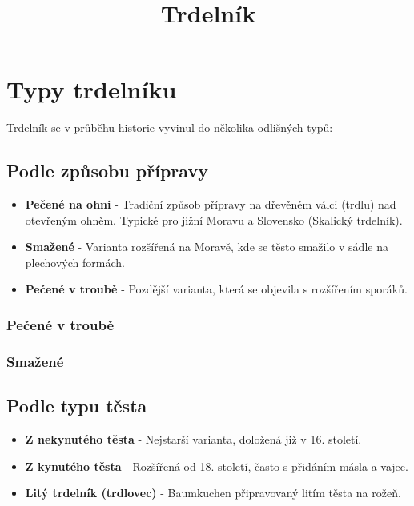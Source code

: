 \documentclass[a5paper,10pt]{book}
\title{Trdelník}
\begin{document}
\shorthandoff{-}


\frontmatter
\maketitle
\ifdefined\HCode\else
\tableofcontents
\fi

\mainmatter




\chapter{Typy trdelníku}
Trdelník se v průběhu historie vyvinul do několika odlišných typů:

\section{Podle způsobu přípravy}
\begin{itemize}
\item \textbf{Pečené na ohni} - Tradiční způsob přípravy na dřevěném válci (trdlu) nad otevřeným ohněm. Typické pro jižní Moravu a Slovensko (Skalický trdelník).
\item \textbf{Smažené} - Varianta rozšířená na Moravě, kde se těsto smažilo v sádle na plechových formách.
\item \textbf{Pečené v troubě} - Pozdější varianta, která se objevila s rozšířením sporáků.
\end{itemize}

\subsection{Pečené v troubě}

\lipsum[1-3]

\subsection{Smažené}

\lipsum[4-6]


\section{Podle typu těsta}
\begin{itemize}
\item \textbf{Z nekynutého těsta} - Nejstarší varianta, doložená již v 16. století.
\item \textbf{Z kynutého těsta} - Rozšířená od 18. století, často s přidáním másla a vajec.
\item \textbf{Litý trdelník (trdlovec)} - Baumkuchen připravovaný litím těsta na rožeň.
\end{itemize}
\end{document}

